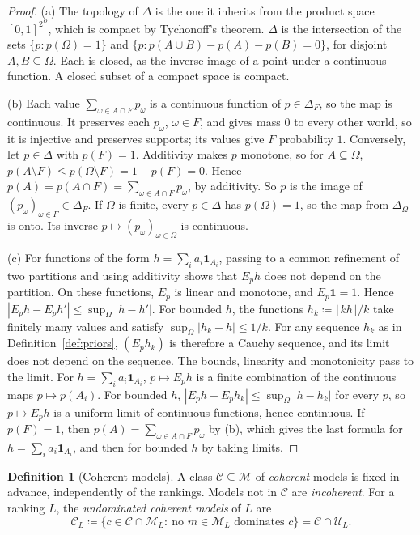 \documentclass[11pt]{article}
\theoremstyle{definition}
\newtheorem{definition}[theorem]{Definition}
\theoremstyle{remark}
\newcommand{\M}{\mathcal M}
\newcommand{\C}{\mathcal C}
\newcommand{\U}{\mathcal U}
\begin{document}
\begin{proof}
(a) The topology of $\Delta$ is the one it inherits from the product space $[0,1]^{2^\Omega}$, which is compact by Tychonoff's theorem. $\Delta$ is the intersection of the sets $\{p:p(\Omega)=1\}$ and $\{p:p(A\cup B)-p(A)-p(B)=0\}$, for disjoint $A,B\subseteq\Omega$. Each is closed, as the inverse image of a point under a continuous function. A closed subset of a compact space is compact.

(b) Each value $\sum_{\omega\in A\cap F}p_\omega$ is a continuous function of $p\in\Delta_F$, so the map is continuous. It preserves each $p_\omega$, $\omega\in F$, and gives mass $0$ to every other world, so it is injective and preserves supports; its values give $F$ probability $1$. Conversely, let $p\in\Delta$ with $p(F)=1$. Additivity makes $p$ monotone, so for $A\subseteq\Omega$, $p(A\setminus F)\le p(\Omega\setminus F)=1-p(F)=0$. Hence $p(A)=p(A\cap F)=\sum_{\omega\in A\cap F}p_\omega$, by additivity. So $p$ is the image of $(p_\omega)_{\omega\in F}\in\Delta_F$. If $\Omega$ is finite, every $p\in\Delta$ has $p(\Omega)=1$, so the map from $\Delta_\Omega$ is onto. Its inverse $p\mapsto(p_\omega)_{\omega\in\Omega}$ is continuous.

(c) For functions of the form $h=\sum_ia_i\mathbf 1_{A_i}$, passing to a common refinement of two partitions and using additivity shows that $E_ph$ does not depend on the partition. On these functions, $E_p$ is linear and monotone, and $E_p\mathbf 1=1$. Hence $|E_ph-E_ph'|\le\sup_\Omega|h-h'|$. For bounded $h$, the functions $h_k\coloneqq\lfloor kh\rfloor/k$ take finitely many values and satisfy $\sup_\Omega|h_k-h|\le1/k$. For any sequence $h_k$ as in Definition~\ref{def:priors}, $(E_ph_k)$ is therefore a Cauchy sequence, and its limit does not depend on the sequence. The bounds, linearity and monotonicity pass to the limit. For $h=\sum_ia_i\mathbf 1_{A_i}$, $p\mapsto E_ph$ is a finite combination of the continuous maps $p\mapsto p(A_i)$. For bounded $h$, $|E_ph-E_ph_k|\le\sup_\Omega|h-h_k|$ for every $p$, so $p\mapsto E_ph$ is a uniform limit of continuous functions, hence continuous. If $p(F)=1$, then $p(A)=\sum_{\omega\in A\cap F}p_\omega$ by (b), which gives the last formula for $h=\sum_ia_i\mathbf 1_{A_i}$, and then for bounded $h$ by taking limits.
\end{proof}
\endgroup

\begin{definition}[Coherent models]\label{def:coherence-property}
A class $\C\subseteq\M$ of \emph{coherent} models is fixed in advance, independently of the rankings. Models not in $\C$ are \emph{incoherent}. For a ranking $L$, the \emph{undominated coherent models} of $L$ are
\[
\C_L\coloneqq\{c\in\C\cap\M_L:\ \text{no } m\in\M_L \text{ dominates } c\}=\C\cap\U_L.
\]
\end{definition}
\end{document}
